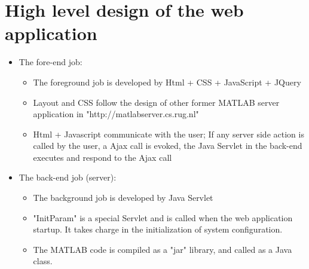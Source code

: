 \documentclass[a4paper]{article}
\begin{document}
\section{High level design of the web application}
\begin{itemize}
\item The fore-end job:
	\begin{itemize}
	\item The foreground job is developed by Html + CSS + JavaScript + JQuery
	\item Layout and CSS follow the design of other former MATLAB server application in "http://matlabserver.cs.rug.nl"
	\item Html + Javascript communicate with the user; If any server side action is called by the user, a Ajax call is evoked, the Java Servlet in the back-end executes and respond to the Ajax call
	\end{itemize}
\item The back-end job (server):
	\begin{itemize}
	\item The background job is developed by Java Servlet
	\item "InitParam" is a special Servlet and is called when the web application startup. It takes charge in the initialization of system configuration.
	\item The MATLAB code is compiled as a "jar" library, and called as a Java class.
	\end{itemize}
\end{itemize}
\end{document}
